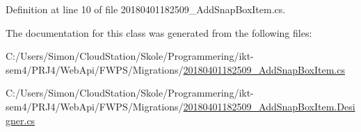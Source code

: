 Definition at line 10 of file 20180401182509\+\_\+\+Add\+Snap\+Box\+Item.\+cs.



The documentation for this class was generated from the following files\+:\begin{DoxyCompactItemize}
\item 
C\+:/\+Users/\+Simon/\+Cloud\+Station/\+Skole/\+Programmering/ikt-\/sem4/\+P\+R\+J4/\+Web\+Api/\+F\+W\+P\+S/\+Migrations/\mbox{\hyperlink{20180401182509___add_snap_box_item_8cs}{20180401182509\+\_\+\+Add\+Snap\+Box\+Item.\+cs}}\item 
C\+:/\+Users/\+Simon/\+Cloud\+Station/\+Skole/\+Programmering/ikt-\/sem4/\+P\+R\+J4/\+Web\+Api/\+F\+W\+P\+S/\+Migrations/\mbox{\hyperlink{20180401182509___add_snap_box_item_8_designer_8cs}{20180401182509\+\_\+\+Add\+Snap\+Box\+Item.\+Designer.\+cs}}\end{DoxyCompactItemize}
